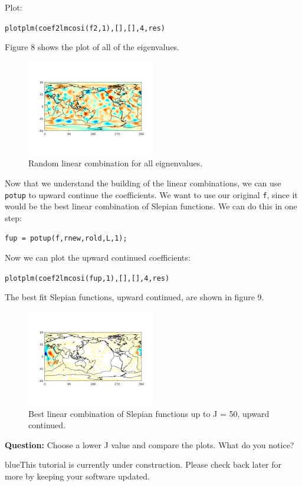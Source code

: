 \documentclass[11pt]{article}
\newcommand{\TAG}{\begin{color}{blue}This tutorial is currently under construction. Please check back later for more by keeping your software updated.\end{color}}
\begin{document}
Plot:

\verb|plotplm(coef2lmcosi(f2,1),[],[],4,res)|

Figure 8 shows the plot of all of the eigenvalues.

\begin{figure}[H]
	\centering
	\includegraphics[width=0.5\textwidth]{figures/f2ml.png}
	\caption{Random linear combination for all eignenvalues.}
\end{figure}


Now that we understand the building of the linear combinations, we can use \verb|potup| to upward continue the coefficients.  We want to use our original \verb|f|, since it would be the best linear combination of Slepian functions.  We can do this in one step:

\verb|fup = potup(f,rnew,rold,L,1);|

Now we can plot the upward continued coefficients:

\verb|plotplm(coef2lmcosi(fup,1),[],[],4,res)|

The best fit Slepian functions, upward continued, are shown in figure 9.

\begin{figure}[H]
	\centering
	\includegraphics[width=0.5\textwidth]{figures/fup_ml.png}
	\caption{Best linear combination of Slepian functions up to J = 50, upward continued.}
\end{figure}

\textbf{Question:} Choose a lower J value and compare the plots.  What do you notice?


\TAG
\end{document}
